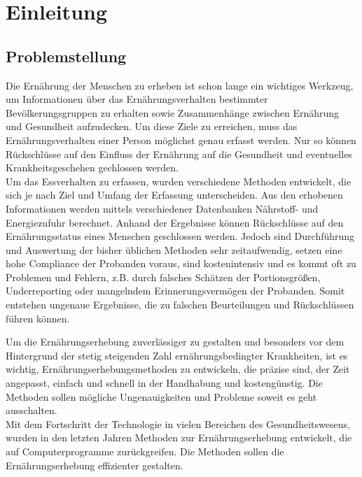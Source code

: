 
\section{Einleitung}

\subsection{Problemstellung}
Die Ernährung der Menschen zu erheben ist schon lange ein wichtiges Werkzeug, um Informationen über das Ernährungsverhalten bestimmter Bevölkerungsgruppen zu erhalten sowie Zusammenhänge zwischen Ernährung und Gesundheit aufzudecken.\cite{muller2007ernahrungsmedizinische}
Um diese Ziele zu erreichen, muss das Ernährungsverhalten einer Person möglichst genau erfasst werden. Nur so können Rückschlüsse auf den Einfluss der Ernährung auf die Gesundheit und eventuelles Krankheitsgeschehen gechlossen werden. \\
Um das Essverhalten zu erfassen, wurden verschiedene Methoden entwickelt, die sich je nach Ziel und Umfang der Erfassung unterscheiden. Aus den erhobenen Informationen werden mittels verschiedener Datenbanken Nährstoff- und Energiezufuhr berechnet. Anhand der Ergebnisse können Rückschlüsse auf den Ernährungsstatus eines Menschen geschlossen werden. Jedoch sind Durchführung und Auswertung der bisher üblichen Methoden sehr zeitaufwendig, setzen eine hohe Compliance der Probanden voraus, sind kostenintensiv und es kommt oft zu Problemen und Fehlern, z.B. durch falsches Schätzen der Portionsgrößen, Underreporting oder mangelndem Erinnerungsvermögen der Probanden. Somit entstehen  ungenaue Ergebnisse, die zu falschen Beurteilungen und Rückschlüssen führen können.\cite{schneider20062}

Um die Ernährungserhebung zuverlässiger zu gestalten und besonders vor dem Hintergrund der stetig steigenden Zahl ernährungsbedingter Krankheiten, ist es wichtig, Ernährungserhebungsmethoden zu entwickeln, die präzise sind, der Zeit angepasst, einfach und schnell in der Handhabung und kostengünstig.\cite{kovatsch2014gesunde} Die Methoden sollen mögliche Ungenauigkeiten und Probleme soweit es geht ausschalten. \\
Mit dem Fortschritt der Technologie in vielen Bereichen des Gesundheitswesens, wurden in den letzten Jahren Methoden zur Ernährungserhebung entwickelt, die auf Computerprogramme zurückgreifen. Die Methoden sollen die Ernährungserhebung effizienter gestalten. \\
 



